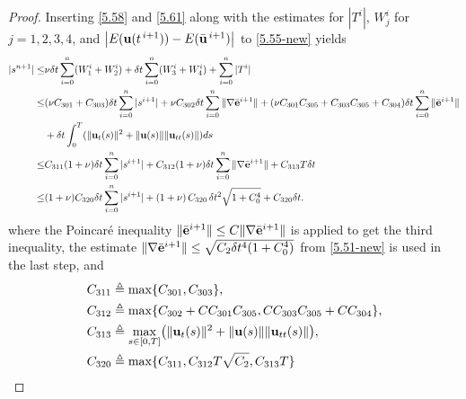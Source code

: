 \documentclass{article}
\theoremstyle{definition}                   %
\begin{document}
\begin{proof}
Inserting \eqref{5.58} and \eqref{5.61} along with the estimates for $|T^i|$, $W^i_j$ for $j=1,2,3,4$, 
and  $\bigl|E({\bf u}(t^{\,i+1}))-E(\bar{\bf u}^{\,i+1})\bigr|$ to \eqref{5.55-new} yields
\begin{align}
|s^{n+1}|
\le & \nu \delta t
\sum_{i=0}^n (W_1^i + W_2^i)  
+ \delta t \sum_{i=0}^n (W_3^i+ W_4^i)
+ \sum_{i=0}^n |T^i| 
\notag \\
\le &
(\nu C_{301} + C_{303}) \delta t \sum_{i=0}^n |s^{i+1}| 
+ \nu C_{302} \delta t 
\sum_{i=0}^n \|\nabla\bar{\bf e}^{i+1} \| 
+  (\nu C_{301}C_{305} + C_{303} C_{305} + C_{304} ) \delta t \sum_{i=0}^n \|\bar{\bf e}^{i+1}\| 
\notag \\
& + \delta t \int_0^T (\|{\bf u}_t(s) \|^2 + 
  \|{\bf u}(s) \|  \|{\bf u}_{tt}(s) \| ) ds
\notag \\
\le &   
C_{311} (1+\nu) \delta t \sum_{i=0}^n |s^{i+1}| 
+ 
C_{312} (1+\nu) \delta t \sum_{i=0}^n 
\|\nabla\bar{\bf e}^{i+1} \| 
+C_{313} T \delta t
\notag \\
\le &   
(1+\nu) C_{320} \delta t \sum_{i=0}^n |s^{i+1}| 
+ (1+\nu)\, C_{320}\,  \delta t^2 
\sqrt{1+C^4_0} 
 +C_{320} \delta t.
\label{5.64-after-new}
\end{align}
where the Poincar\'{e} inequality $\|\bar{\bf e}^{i+1}\| \le C \| \nabla \bar{\bf e}^{i+1}\|$ is applied to get the third inequality, 
the estimate $\|\nabla\bar{\bf e}^{i+1} \| \le \sqrt{C_2 \delta t^4 (1+C_0^4)}$ from \eqref{5.51-new} is used in the last step, and 
\begin{align}
C_{311} &\triangleq \max\{C_{301},C_{303}  \},
\notag\\
C_{312} &\triangleq \max\{ C_{302} + C C_{301} C_{305}, 
  C C_{303} C_{305} + C C_{304}  \},
\notag\\
C_{313} &\triangleq \max_{s\in [0,T]} 
\bigl( \|{\bf u}_t(s) \|^2 + \|{\bf u}(s) \|  \|{\bf u}_{tt}(s) \| \bigr),
\notag\\
C_{320} &\triangleq \max\{C_{311}, C_{312} T \sqrt{C_2}, C_{313}T  \}
\end{align}



\end{proof}
\end{document}
